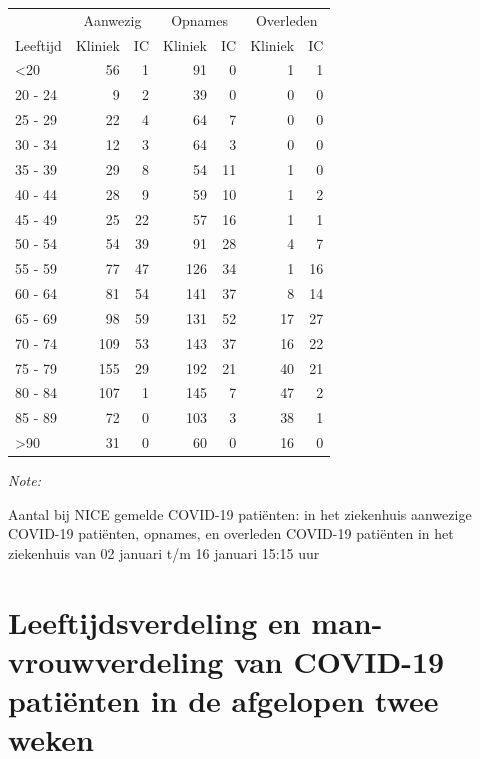\documentclass[
  english,
  man,floatsintext]{apa6}
\begin{document}
\begin{table}
\centering\begingroup\fontsize{10}{12}\selectfont

\begin{threeparttable}
\begin{tabular}{lrrrrrr}
\toprule
\multicolumn{1}{c}{ } & \multicolumn{2}{c}{Aanwezig} & \multicolumn{2}{c}{Opnames} & \multicolumn{2}{c}{Overleden} \\
\cmidrule(l{3pt}r{3pt}){2-3} \cmidrule(l{3pt}r{3pt}){4-5} \cmidrule(l{3pt}r{3pt}){6-7}
Leeftijd & Kliniek & IC & Kliniek & IC & Kliniek & IC\\
\midrule
<20 & 56 & 1 & 91 & 0 & 1 & 1\\
20 - 24 & 9 & 2 & 39 & 0 & 0 & 0\\
25 - 29 & 22 & 4 & 64 & 7 & 0 & 0\\
30 - 34 & 12 & 3 & 64 & 3 & 0 & 0\\
35 - 39 & 29 & 8 & 54 & 11 & 1 & 0\\
40 - 44 & 28 & 9 & 59 & 10 & 1 & 2\\
45 - 49 & 25 & 22 & 57 & 16 & 1 & 1\\
50 - 54 & 54 & 39 & 91 & 28 & 4 & 7\\
55 - 59 & 77 & 47 & 126 & 34 & 1 & 16\\
60 - 64 & 81 & 54 & 141 & 37 & 8 & 14\\
65 - 69 & 98 & 59 & 131 & 52 & 17 & 27\\
70 - 74 & 109 & 53 & 143 & 37 & 16 & 22\\
75 - 79 & 155 & 29 & 192 & 21 & 40 & 21\\
80 - 84 & 107 & 1 & 145 & 7 & 47 & 2\\
85 - 89 & 72 & 0 & 103 & 3 & 38 & 1\\
>90 & 31 & 0 & 60 & 0 & 16 & 0\\
\bottomrule
\end{tabular}
\begin{tablenotes}
\item \textit{Note: } 
\item Aantal bij NICE gemelde COVID-19 patiënten: in het ziekenhuis aanwezige COVID-19 patiënten, opnames, en overleden COVID-19 patiënten in het ziekenhuis van 02 januari t/m 16 januari 15:15 uur
\end{tablenotes}
\end{threeparttable}
\endgroup{}
\end{table}

\newpage

\hypertarget{leeftijdsverdeling-en-man-vrouwverdeling-van-covid-19-patiuxebnten-in-de-afgelopen-twee-weken}{%
\section{Leeftijdsverdeling en man-vrouwverdeling van COVID-19 patiënten in de afgelopen twee weken}\label{leeftijdsverdeling-en-man-vrouwverdeling-van-covid-19-patiuxebnten-in-de-afgelopen-twee-weken}}
\end{document}
